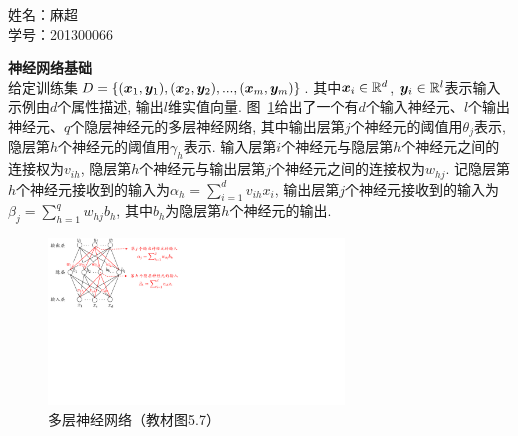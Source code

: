 \documentclass[answers]{exam}  %
\begin{document}
\Large
\noindent
姓名：麻超 \\
学号：201300066 \\
\begin{questions}
    \question [20] \textbf{神经网络基础} \\

    给定训练集$D=\{({\boldsymbol{x}}_1, \boldsymbol{y}_1), ({\boldsymbol{x}}_2, \boldsymbol{y}_2), ..., ({\boldsymbol{x}}_m, \boldsymbol{y}_m)\}$. 其中${\boldsymbol{x}}_i \in \mathbb{R}^d$,
    $\boldsymbol{y}_i \in \mathbb{R}^l$表示输入示例由$d$个属性描述,
    输出$l$维实值向量.
    图~\ref{ch5_img:mlp}给出了一个有$d$个输入神经元、$l$个输出神经元、$q$个隐层神经元的多层神经网络, 其中输出层第$j$个神经元的阈值用$\theta_j$表示, 隐层第$h$个神经元的阈值用$\gamma_h$表示. 输入层第$i$个神经元与隐层第$h$个神经元之间的连接权为$v_{ih}$,
    隐层第$h$个神经元与输出层第$j$个神经元之间的连接权为$w_{hj}$.
    记隐层第$h$个神经元接收到的输入为$\alpha_h=\sum_{i=1}^d v_{ih}x_i$,
    输出层第$j$个神经元接收到的输入为$\beta_j=\sum_{h=1}^q w_{hj}b_h$,
    其中$b_h$为隐层第$h$个神经元的输出.
    \begin{figure}[ht]
        \centering
        \includegraphics[width=0.70\textwidth]{figure/ch5_nn.pdf}
        \caption{多层神经网络（教材图5.7）}\label{ch5_img:mlp}
    \end{figure}


\end{questions}
\end{document}
